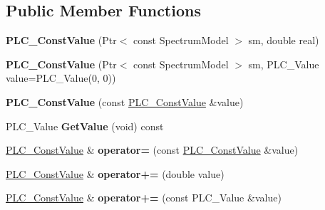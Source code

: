 \subsection*{\-Public \-Member \-Functions}
\begin{DoxyCompactItemize}
\item 
\hypertarget{classns3_1_1PLC__ConstValue_ab53ba48a0336a88ad1f34df6c57ae56e}{{\bfseries \-P\-L\-C\-\_\-\-Const\-Value} (\-Ptr$<$ const \-Spectrum\-Model $>$ sm, double real)}\label{classns3_1_1PLC__ConstValue_ab53ba48a0336a88ad1f34df6c57ae56e}

\item 
\hypertarget{classns3_1_1PLC__ConstValue_abc05a9ac37cd86f55b6dfbd5d44715cd}{{\bfseries \-P\-L\-C\-\_\-\-Const\-Value} (\-Ptr$<$ const \-Spectrum\-Model $>$ sm, \-P\-L\-C\-\_\-\-Value value=\-P\-L\-C\-\_\-\-Value(0, 0))}\label{classns3_1_1PLC__ConstValue_abc05a9ac37cd86f55b6dfbd5d44715cd}

\item 
\hypertarget{classns3_1_1PLC__ConstValue_a0b29730b3749a4ff9caa6d9d1db8f7e3}{{\bfseries \-P\-L\-C\-\_\-\-Const\-Value} (const \hyperlink{classns3_1_1PLC__ConstValue}{\-P\-L\-C\-\_\-\-Const\-Value} \&value)}\label{classns3_1_1PLC__ConstValue_a0b29730b3749a4ff9caa6d9d1db8f7e3}

\item 
\hypertarget{classns3_1_1PLC__ConstValue_a6fa02c1059510a3be4860a4e344da9fa}{\-P\-L\-C\-\_\-\-Value {\bfseries \-Get\-Value} (void) const }\label{classns3_1_1PLC__ConstValue_a6fa02c1059510a3be4860a4e344da9fa}

\item 
\hypertarget{classns3_1_1PLC__ConstValue_a301d2f213ca064ad1da8fb8c3c4c6aa7}{\hyperlink{classns3_1_1PLC__ConstValue}{\-P\-L\-C\-\_\-\-Const\-Value} \& {\bfseries operator=} (const \hyperlink{classns3_1_1PLC__ConstValue}{\-P\-L\-C\-\_\-\-Const\-Value} \&value)}\label{classns3_1_1PLC__ConstValue_a301d2f213ca064ad1da8fb8c3c4c6aa7}

\item 
\hypertarget{classns3_1_1PLC__ConstValue_a5bbac2f3d161f684461ea1278896fde2}{\hyperlink{classns3_1_1PLC__ConstValue}{\-P\-L\-C\-\_\-\-Const\-Value} \& {\bfseries operator+=} (double value)}\label{classns3_1_1PLC__ConstValue_a5bbac2f3d161f684461ea1278896fde2}

\item 
\hypertarget{classns3_1_1PLC__ConstValue_abe709cd6847ef6a7ac5486625f49fad4}{\hyperlink{classns3_1_1PLC__ConstValue}{\-P\-L\-C\-\_\-\-Const\-Value} \& {\bfseries operator+=} (const \-P\-L\-C\-\_\-\-Value \&value)}\label{classns3_1_1PLC__ConstValue_abe709cd6847ef6a7ac5486625f49fad4}


\end{DoxyCompactItemize}
